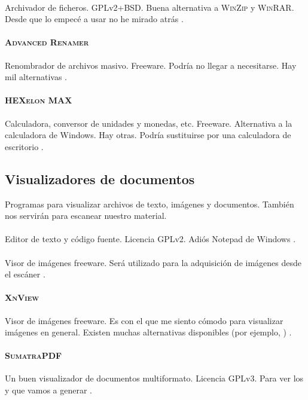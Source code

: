 \documentclass[%
	a5paper,
	10pt,
	twoside,
	openright,
	final,
]{memoir}
\begin{document}
{	\paragraph{\szip} Archivador de ficheros. GPLv2+BSD. Buena alternativa a \textsc{WinZip} y \textsc{WinRAR}. Desde que lo empecé a usar no he mirado atrás \cite{7zip}.
	\paragraph{\textsc{Advanced Renamer}} Renombrador de archivos masivo. Freeware. Podría no llegar a necesitarse. Hay mil alternativas \cite{ARen}.
	\paragraph{\textsc{HEXelon MAX}} Calculadora, conversor de unidades y monedas, etc. Freeware. Alternativa a la calculadora de Windows. Hay otras. Podría sustituirse por una calculadora de escritorio \cite{HEXelonMAX}.

	\subsection{Visualizadores de documentos} Programas para visualizar archivos de texto, imágenes y documentos. También nos servirán para escanear nuestro material.
	\paragraph{\notepad} Editor de texto y código fuente. Licencia GPLv2. Adiós Notepad de Windows \cite{Notepad}.
	\paragraph{\irfanview} Visor de imágenes freeware. Será utilizado para la adquisición de imágenes desde el escáner \cite{IrfanView}.
	\paragraph{\textsc{XnView}} Visor de imágenes freeware. Es con el que me siento cómodo para visualizar imágenes en general. Existen muchas alternativas disponibles (por ejemplo, \irfanview) \cite{XnView}.
	\paragraph{\textsc{SumatraPDF}} Un buen visualizador de documentos multiformato. Licencia GPLv3. Para ver los \pdf y \djvu que vamos a generar \cite{SumatraPDF}.
}
\end{document}
